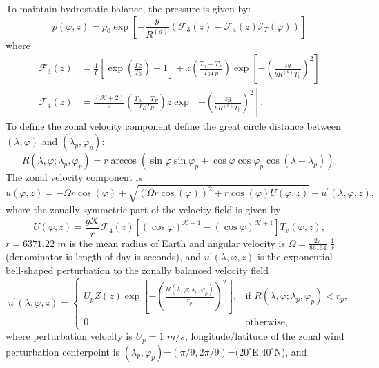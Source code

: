 \documentclass{agujournal}
\begin{document}
To maintain hydrostatic balance, the pressure is given by:
\begin{equation}
p(\varphi, z) = p_0\exp \left[ -\frac{g}{R^{(d)}}(\mathcal{F}_{3}(z) -\mathcal{F}_{4}(z) \mathcal{I}_T(\varphi) ) \right]\label{eq:baroPmoist}
\end{equation} where
\begin{align}
\mathcal{F}_{3}(z) &=\frac{1}{\Gamma} \left[ \exp\left( \frac{\Gamma z}{T_0} \right)-1 \right] + z \left(\frac{T_0-T_P}{T_0T_P} \right) \exp\left[-\left(\frac{z g}{b R^{(d)} T_0}\right)^2\right] \\
\mathcal{F}_{4}(z) &=\frac{({\mathcal{K}}+2)}{2} \left(\frac{T_E-T_P}{T_E T_P} \right) z \exp\left[-\left(\frac{z g}{b R^{(d)} T_0}\right)^2\right].
\end{align}    
To define the zonal velocity component define the great circle distance between $(\lambda,\varphi)$ and $(\lambda_p,\varphi_p)$:
\begin{equation}
R(\lambda, \varphi; \lambda_p, \varphi_p) = r \arccos \left( \sin \varphi \sin \varphi_p + \cos \varphi \cos \varphi_p \cos (\lambda - \lambda_p) \right).
\end{equation}
The zonal velocity component is
\begin{equation}
u(\varphi, z) = -\Omega r \cos(\varphi)+\sqrt{(\Omega r\cos(\varphi))^2+ r\cos(\varphi)U(\varphi,z)}+u^\prime(\lambda, \varphi, z),
\end{equation} where the zonally symmetric part of the velocity field is given by
\begin{equation}
U(\varphi,z) = \frac{g {\mathcal{K}}}{r} \mathcal{F}_{4}(z) \left[ (\cos \varphi)^{{\mathcal{K}} - 1} - (\cos \varphi)^{{\mathcal{K}} + 1} \right] T_v(\varphi, z),
\end{equation} 
$r=6371.22$ $m$ is the mean radius of Earth and angular velocity is $\Omega=\frac{2\pi}{86164}$ $\frac{1}{s}$ (denominator is length of day is seconds), and $u^\prime(\lambda, \varphi, z)$ is the exponential bell-shaped perturbation to the zonally balanced velocity field
\begin{equation}
u^\prime(\lambda, \varphi, z) = \left\{ \begin{array}{ll} U_p Z(z)  \exp \left[ - \left( \frac{R(\lambda, \varphi; \lambda_p, \varphi_p)}{r_p} \right)^2 \right], & \mbox{if $R(\lambda, \varphi; \lambda_p, \varphi_p) < r_p$,} \\ 0, & \mbox{otherwise,} \end{array} \right.
\end{equation} where perturbation velocity is $U_p=1$ $m/s$, longitude/latitude of the zonal wind perturbation centerpoint is $(\lambda_p,\varphi_p)$=$(\pi/9,2\pi/9)$=$(20^{\circ}$E,$40^{\circ}$N),  and
\end{document}
